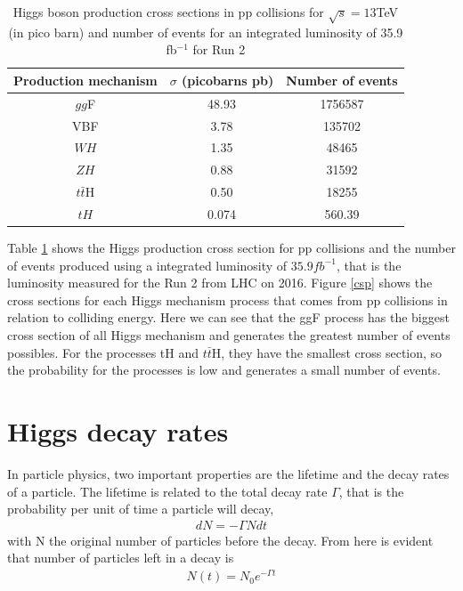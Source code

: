 \begin{table}[ht]
\centering
\caption[Higgs boson production cross sections in pp collisions number of events for  35.9 fb$^{-1}$ ]{	Higgs boson production cross sections in pp collisions for $\sqrt{s}=13$TeV (in pico barn) and number of events for an integrated luminosity of 35.9 fb$^{-1}$ for Run 2  \cite{pd}}
\begin{tabular}{|c|c|c|}
\hline
Production mechanism &
$\sigma$ (picobarns pb) & Number of events \\
\hline
$gg$F & 48.93 & 1756587\\
\hline
VBF & 3.78 & 135702\\
\hline
$WH$ & 1.35 & 48465\\
\hline
$ZH$ &0.88 & 31592\\
\hline
$t\bar{t}$H & 0.50 & 18255\\
\hline
$tH$	& 0.074 & 560.39\\
\hline
\end{tabular}
\label{crt}
\end{table}

 Table \ref{crt} shows the Higgs production cross section for pp collisions and the number of events produced using a integrated luminosity of $35.9 fb^{-1}$, that is the luminosity measured for the Run 2 from LHC on 2016\cite{pd}. Figure \ref{csp} shows the cross sections for each Higgs mechanism process  that comes from pp collisions in relation to colliding energy.
Here we can see that the ggF process has the biggest cross section of all Higgs mechanism and generates the greatest number of events possibles. For the processes tH and $t\bar{t}$H, they have the smallest cross section, so the probability for the processes is low and generates a small number of events. 

\section{Higgs decay rates}
In particle physics, two important properties are the lifetime and the decay rates of a particle. The lifetime is related to the total decay rate $\Gamma$, that is the probability per unit of time a particle will decay, 
\begin{align}
  dN=-\Gamma N dt
\end{align}
with N the original number of particles before the decay. From here is evident that number of particles left in a decay is 
\begin{align}
N(t)=N_0 e^{-\Gamma t}
\end{align}

